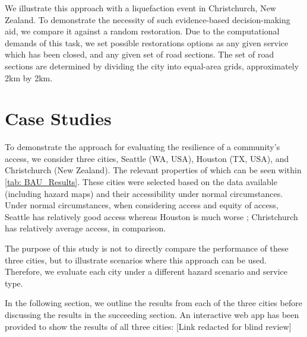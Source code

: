 \documentclass[review,3p,times,onecolumn,sort&compress,12pt]{elsarticle}
\let \cite \parencite
\begin{document}
We illustrate this approach with a liquefaction event in Christchurch, New Zealand.
To demonstrate the necessity of such evidence-based decision-making aid, we compare it against a random restoration.
Due to the computational demands of this task, we set possible restorations options as any given service which has been closed, and any given set of road sections.
The set of road sections are determined by dividing the city into equal-area grids, approximately 2km by 2km.



\section{Case Studies}
To demonstrate the approach for evaluating the resilience of a community's access, we consider three cities, Seattle (WA, USA), Houston (TX, USA), and Christchurch (New Zealand).
The relevant properties of which can be seen within \autoref{tab: BAU_Results}.
These cities were selected based on the data available (including hazard maps) and their accessibility under normal circumstances.
Under normal circumstances, when considering access and equity of access, Seattle has relatively good access whereas Houston is much worse \cite{Logan2021-ineq}; Christchurch has relatively average access, in comparison.

The purpose of this study is not to directly compare the performance of these three cities, but to illustrate scenarios where this approach can be used.
Therefore, we evaluate each city under a different hazard scenario and service type.

In the following section, we outline the results from each of the three cities before discussing the results in the succeeding section.
An interactive web app has been provided to show the results of all three cities: [Link redacted for blind review]
\end{document}
